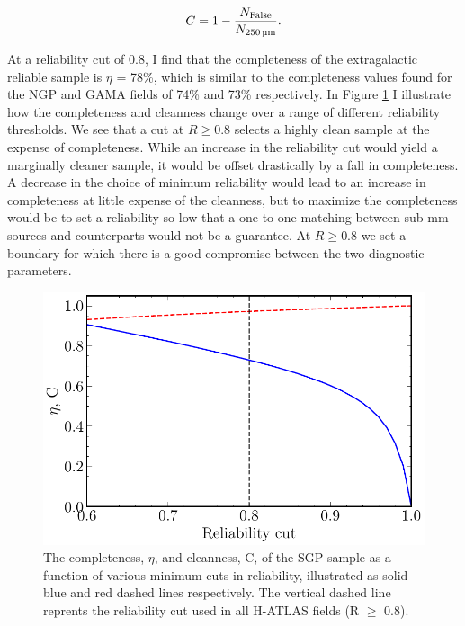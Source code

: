 \begin{equation}
    C = 1 - \frac{N_{\textrm{False}}}{N_{\textrm{250\,\micron}}}.
\label{eq:cleanness}
\end{equation}

At a reliability cut of 0.8, I find that the completeness of the extragalactic reliable sample is $\eta$ = 78\%, which is similar to the completeness values found for the NGP and GAMA fields of 74\% and 73\% respectively. In Figure \ref{fig:completeness_and_cleanness} I illustrate how the completeness and cleanness change over a range of different reliability thresholds. We see that a cut at $R \geq 0.8$ selects a highly clean sample at the expense of completeness. While an increase in the reliability cut would yield a marginally cleaner sample, it would be offset drastically by a fall in completeness. A decrease in the choice of minimum reliability would lead to an increase in completeness at little expense of the cleanness, but to maximize the completeness would be to set a reliability so low that a one-to-one matching between sub-mm sources and counterparts would not be a guarantee. At $R \geq 0.8$ we set a boundary for which there is a good compromise between the two diagnostic parameters.

\begin{figure}
    \centering
	\includegraphics[width=\columnwidth]{Figures/completeness_and_cleanness.pdf}
	\caption{The completeness, $\eta$, and cleanness, C, of the SGP sample as a function of various minimum cuts in reliability, illustrated as solid blue and red dashed lines respectively. The vertical dashed line reprents the reliability cut used in all H-ATLAS fields (R $\geq$ 0.8).}
	\label{fig:completeness_and_cleanness}
\end{figure}

